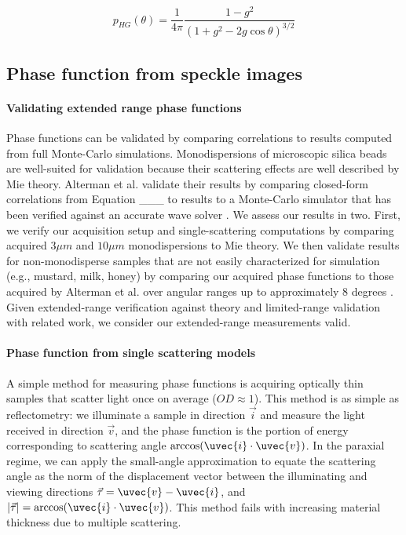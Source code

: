 \begin{equation}
    p_{HG}(\theta) = \frac{1}{4\pi} \frac{1 - g^2}{(1 + g^2 - 2 g \cos{\theta})^{3/2}}
\end{equation}

\subsection{Phase function from speckle images}

\paragraph{Validating extended range phase functions}
Phase functions can be validated by comparing correlations to results computed from full Monte-Carlo simulations. Monodispersions of microscopic silica beads are well-suited for validation because their scattering effects are well described by Mie theory. Alterman et al. validate their results by comparing closed-form correlations from Equation \_\_\_ to results to a Monte-Carlo simulator \cite{bar2019monte} that has been verified against an accurate wave solver \cite{thierry2015mu}. We assess our results in two. First, we verify our acquisition setup and single-scattering computations by comparing acquired $3\mu m$ and $10\mu m$ monodispersions to Mie theory. We then validate results for non-monodisperse samples that are not easily characterized for simulation (e.g., mustard, milk, honey) by comparing our acquired phase functions to those acquired by Alterman et al. over angular ranges up to approximately 8 degrees \cite{alterman2022direct}. Given extended-range verification against theory and limited-range validation with related work, we consider our extended-range measurements valid.

\paragraph{Phase function from single scattering models}
A simple method for measuring phase functions is acquiring optically thin samples that scatter light once on average ($OD \approx 1$). This method is as simple as reflectometry: we illuminate a sample in direction $\vec{i}$ and measure the light received in direction $\vec{v}$, and the phase function is the portion of energy corresponding to scattering angle $\arccos(\uvec{i} \cdot \uvec{v})$. In the paraxial regime, we can apply the small-angle approximation to equate the scattering angle as the norm of the displacement vector between the illuminating and viewing directions $\vec{\tau} = \uvec{v} - \uvec{i}$, and $ |\vec{\tau}| = \arccos(\uvec{i} \cdot \uvec{v})$. This method fails with increasing material thickness due to multiple scattering.
